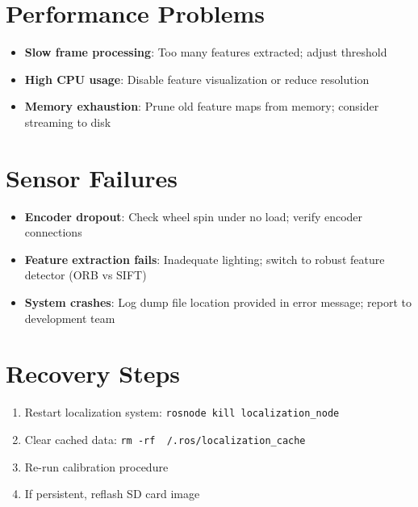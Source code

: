\section{Performance Problems}

\begin{itemize}
    \item \textbf{Slow frame processing}: Too many features extracted; adjust threshold
    \item \textbf{High CPU usage}: Disable feature visualization or reduce resolution
    \item \textbf{Memory exhaustion}: Prune old feature maps from memory; consider streaming to disk
\end{itemize}

\section{Sensor Failures}

\begin{itemize}
    \item \textbf{Encoder dropout}: Check wheel spin under no load; verify encoder connections
    \item \textbf{Feature extraction fails}: Inadequate lighting; switch to robust feature detector (ORB vs SIFT)
    \item \textbf{System crashes}: Log dump file location provided in error message; report to development team
\end{itemize}

\section{Recovery Steps}

\begin{enumerate}
    \item Restart localization system: \texttt{rosnode kill localization\_node}
    \item Clear cached data: \texttt{rm -rf ~/.ros/localization\_cache}
    \item Re-run calibration procedure
    \item If persistent, reflash SD card image
\end{enumerate}







